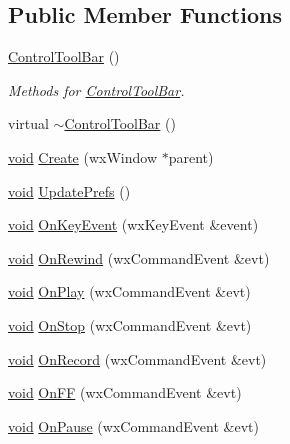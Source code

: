 \subsection*{Public Member Functions}
\begin{DoxyCompactItemize}
\item 
\hyperlink{class_control_tool_bar_acbe1ddf2c51bcd7c14323b2a4f5b72cf}{Control\+Tool\+Bar} ()
\begin{DoxyCompactList}\small\item\em Methods for \hyperlink{class_control_tool_bar}{Control\+Tool\+Bar}. \end{DoxyCompactList}\item 
virtual \hyperlink{class_control_tool_bar_a6b142b01c28a08e0c870d0b4e7ab71b7}{$\sim$\+Control\+Tool\+Bar} ()
\item 
\hyperlink{sound_8c_ae35f5844602719cf66324f4de2a658b3}{void} \hyperlink{class_control_tool_bar_a01c89c109893b699476e5624038cdcb1}{Create} (wx\+Window $\ast$parent)
\item 
\hyperlink{sound_8c_ae35f5844602719cf66324f4de2a658b3}{void} \hyperlink{class_control_tool_bar_ab7c971607e2f3fdcc0a26af5896a0059}{Update\+Prefs} ()
\item 
\hyperlink{sound_8c_ae35f5844602719cf66324f4de2a658b3}{void} \hyperlink{class_control_tool_bar_add6569dd1224d280e4acd72ee40656d1}{On\+Key\+Event} (wx\+Key\+Event \&event)
\item 
\hyperlink{sound_8c_ae35f5844602719cf66324f4de2a658b3}{void} \hyperlink{class_control_tool_bar_aeb4dc43e09e4f1a213db940f1f3de4f4}{On\+Rewind} (wx\+Command\+Event \&evt)
\item 
\hyperlink{sound_8c_ae35f5844602719cf66324f4de2a658b3}{void} \hyperlink{class_control_tool_bar_a05474425603227d5f6c3ebb7fe17b940}{On\+Play} (wx\+Command\+Event \&evt)
\item 
\hyperlink{sound_8c_ae35f5844602719cf66324f4de2a658b3}{void} \hyperlink{class_control_tool_bar_adf5178b939ae71ee55c484440b8c8751}{On\+Stop} (wx\+Command\+Event \&evt)
\item 
\hyperlink{sound_8c_ae35f5844602719cf66324f4de2a658b3}{void} \hyperlink{class_control_tool_bar_a7bc83821ef90b2305b27abb09d7c5aff}{On\+Record} (wx\+Command\+Event \&evt)
\item 
\hyperlink{sound_8c_ae35f5844602719cf66324f4de2a658b3}{void} \hyperlink{class_control_tool_bar_aef7aa97a0d4102535bfcb1a34b46bc7b}{On\+FF} (wx\+Command\+Event \&evt)
\item 
\hyperlink{sound_8c_ae35f5844602719cf66324f4de2a658b3}{void} \hyperlink{class_control_tool_bar_ae45304267f27abf0878a003e0014787a}{On\+Pause} (wx\+Command\+Event \&evt)

\end{DoxyCompactItemize}
